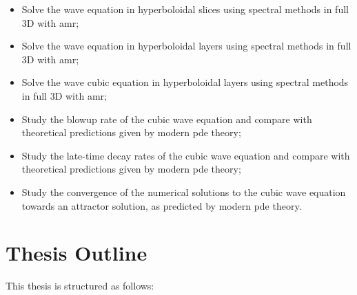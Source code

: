 \begin{itemize}
    \item Solve the wave equation in hyperboloidal slices using spectral methods in full 3D with \acrshort{amr};
    
    \item Solve the wave equation in hyperboloidal layers using spectral methods in full 3D with \acrshort{amr};
    
    \item Solve the wave cubic equation in hyperboloidal layers using spectral methods in full 3D with \acrshort{amr};

    \item Study the blowup rate of the cubic wave equation and compare with theoretical predictions given by modern \acrshort{pde} theory;

    \item Study the late-time decay rates of the cubic wave equation and compare with theoretical predictions given by modern \acrshort{pde} theory;
    
    \item Study the convergence of the numerical solutions to the cubic wave equation towards an attractor solution, as predicted by modern \acrshort{pde} theory.
\end{itemize}


\section{Thesis Outline}
\label{section:outline}

This thesis is structured as follows:

